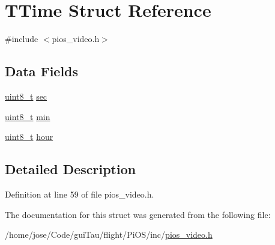 \hypertarget{struct_t_time}{\section{T\-Time Struct Reference}
\label{struct_t_time}
}


{\ttfamily \#include $<$pios\-\_\-video.\-h$>$}

\subsection*{Data Fields}
\begin{DoxyCompactItemize}
\item 
\hyperlink{stdint_8h_aba7bc1797add20fe3efdf37ced1182c5}{uint8\-\_\-t} \hyperlink{group___p_i_o_s___v_i_d_e_o_gaa6288943af354a6cb143f2ad677cfece}{sec}
\item 
\hyperlink{stdint_8h_aba7bc1797add20fe3efdf37ced1182c5}{uint8\-\_\-t} \hyperlink{group___p_i_o_s___v_i_d_e_o_gadb9b0440ee5ef05786949736913ce45c}{min}
\item 
\hyperlink{stdint_8h_aba7bc1797add20fe3efdf37ced1182c5}{uint8\-\_\-t} \hyperlink{group___p_i_o_s___v_i_d_e_o_gae7afd210e593b007611ac237bd32d30d}{hour}
\end{DoxyCompactItemize}


\subsection{Detailed Description}


Definition at line 59 of file pios\-\_\-video.\-h.



The documentation for this struct was generated from the following file\-:\begin{DoxyCompactItemize}
\item 
/home/jose/\-Code/gui\-Tau/flight/\-Pi\-O\-S/inc/\hyperlink{pios__video_8h}{pios\-\_\-video.\-h}\end{DoxyCompactItemize}
